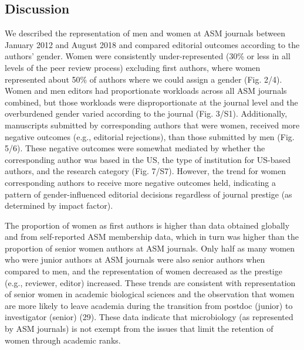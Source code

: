 \documentclass[11pt,]{article}
\begin{document}
\subsection{Discussion}\label{discussion}

We described the representation of men and women at ASM journals between
January 2012 and August 2018 and compared editorial outcomes according
to the authors' gender. Women were consistently under-represented (30\%
or less in all levels of the peer review process) excluding first
authors, where women represented about 50\% of authors where we could
assign a gender (Fig. 2/4). Women and men editors had proportionate
workloads across all ASM journals combined, but those workloads were
disproportionate at the journal level and the overburdened gender varied
according to the journal (Fig. 3/S1). Additionally, manuscripts
submitted by corresponding authors that were women, received more
negative outcomes (e.g., editorial rejections), than those submitted by
men (Fig. 5/6). These negative outcomes were somewhat mediated by
whether the corresponding author was based in the US, the type of
institution for US-based authors, and the research category (Fig. 7/S7).
However, the trend for women corresponding authors to receive more
negative outcomes held, indicating a pattern of gender-influenced
editorial decisions regardless of journal prestige (as determined by
impact factor).

The proportion of women as first authors is higher than data obtained
globally and from self-reported ASM membership data, which in turn was
higher than the proportion of senior women authors at ASM journals. Only
half as many women who were junior authors at ASM journals were also
senior authors when compared to men, and the representation of women
decreased as the prestige (e.g., reviewer, editor) increased. These
trends are consistent with representation of senior women in academic
biological sciences and the observation that women are more likely to
leave academia during the transition from postdoc (junior) to
investigator (senior) (29). These data indicate that microbiology (as
represented by ASM journals) is not exempt from the issues that limit
the retention of women through academic ranks.
\end{document}
